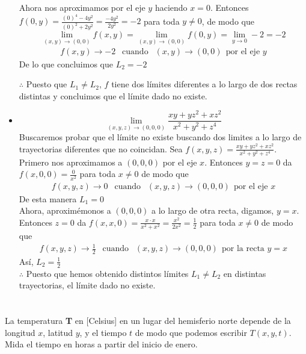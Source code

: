 \documentclass[12pt]{article}
\begin{document}
\begin{itemize}[format=\textbf]
  Ahora nos aproximamos por el eje $y$ haciendo $x=0$. Entonces $f(0,y) =  \frac{(0)^4-4y^2}{(0)^2+2y^2} =  \frac{-4y^2}{2y^2} =-2$ para toda $y \neq 0$, de modo que
  $$\lim_{(x,y) \to (0,0)} f(x,y) =  \lim_{(x,y) \to (0,0)} f(0,y) =  \lim_{y \to 0} -2 = -2  $$
  \begin{align*}
    f(x,y) \rightarrow -2 ~~ \text{ cuando }~~ (x,y) \rightarrow (0,0) ~~ \text{por el eje }y
  \end{align*}
  De lo que concluimos que $L_2 = -2$

  $\therefore$ Puesto que $L_1 \neq L_2$, $f$ tiene dos límites diferentes a lo largo de dos rectas distintas y concluimos que el límite dado no existe.

\item $$\lim_{(x,y,z) \to (0,0,0)} \frac{xy+yz^2+xz^2}{x^2+y^2+z^4}$$
  Buscaremos probar que el límite no existe buscando dos limites a lo largo de trayectorias diferentes que no coincidan.
  Sea $f(x,y,z) =  \frac{xy+yz^2+xz^2}{x^2+y^2+z^4}$. Primero nos aproximamos a $(0,0,0)$ por el eje $x$. Entonces $y=z=0$ da $f(x,0,0)= \frac{0}{x^2}$ para toda $x \neq 0$ de modo que 
  \begin{align*}
    f(x,y,z) \rightarrow 0 ~~ \text{ cuando }~~ (x,y,z) \rightarrow (0,0,0) ~~ \text{por el eje }x
  \end{align*}
  De esta manera $L_1 = 0$ \\
  Ahora, aproximémonos a $(0, 0,0)$ a lo largo de otra recta, digamos, $y=x$. Entonces $z=0$ da $f(x,x,0)= \frac{x\cdot x}{x^2+x^2}= \frac{x^2}{2x^2}=\frac{1}{2}$ para toda $x\neq 0$ de modo que 
  \begin{align*}
    f(x,y,z) \rightarrow \frac{1}{2} ~~ \text{ cuando }~~ (x,y,z) \rightarrow (0,0,0) ~~ \text{por la recta }y=x
  \end{align*}
  Así, $L_2 = \frac{1}{2} $ \\
$\therefore$ Puesto que hemos obtenido distintos límites $L_1 \neq L_2$ en distintas trayectorias,
el límite dado no existe.

\end{itemize}

\section{}

La temperatura \textbf{T} en [Celsius] en un lugar del hemisferio norte depende de la longitud $x$, latitud $y$, y el tiempo $t$ de modo que podemos escribir $T(x, y, t)$. Mida el tiempo en horas a partir del inicio de enero.
\end{document}
